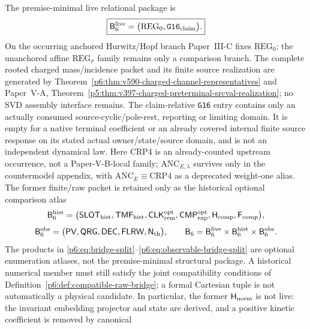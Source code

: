 \documentclass[12pt,a4paper]{article}
\newcommand{\BridgeSix}{\mathsf B_6}
\newcommand{\BridgeLive}{\mathsf B_6^{\rm live}}
\newcommand{\BridgeRaw}{\mathsf B_6^{\rm hist}}
\newcommand{\BridgeObs}{\mathsf B_6^{\rm obs}}
\newcommand{\CLKrem}{\mathsf{CLK}_{\rm rem}}
\newcommand{\CMPexp}{\mathsf{CMP}_{\rm exp}}
\begin{document}
\begin{definition}
\label{p6:def:bridge-split}
The premise-minimal live relational package is
\begin{equation}
\label{p6:eq:live-bridge-split}
\boxed{
\BridgeLive
=
\bigl(
\mathrm{REG}_{0},
\texttt{G16}_{\rm claim}
\bigr).
}
\end{equation}
On the occurring anchored Hurwitz/Hopf branch Paper~III-C fixes
$\mathrm{REG}_0$; the unanchored affine $\mathrm{REG}_\sigma$ family remains
only a comparison branch. The complete rooted charged mass/incidence packet
and its finite source realization are generated by
Theorem~\ref{p6:thm:v590-charged-channel-representatives} and Paper~V-A,
Theorem~\ref{p5:thm:v397-charged-preterminal-srcval-realization}; no SVD
assembly interface remains. The claim-relative \texttt{G16} entry contains
only an actually consumed source-cyclic/pole-rest, reporting or limiting
domain. It is empty for a native terminal coefficient or an already covered
internal finite source response on its stated actual owner/state/source domain,
and is not an independent dynamical law.  Here CRP4 is an already-counted upstream occurrence,
not a Paper-V-B-local family; \(\mathrm{ANC}_{E,\lambda}\) survives only in the countermodel
appendix, with \(\mathrm{ANC}_E\equiv\mathrm{CRP4}\) as a deprecated
weight-one alias.  The former finite/raw packet is retained only as the
historical optional comparison atlas
\begin{equation}
\label{p6:eq:bridge-split}
\BridgeRaw
=
\bigl(
\mathsf{SLOT}_{\rm hist},
\mathsf{TMF}_{\rm hist},
\CLKrem^{\rm opt},
\CMPexp^{\rm opt},
\mathsf H_{\rm comp},
\mathsf F_{\rm comp}
\bigr),
\end{equation}
\begin{equation}
\label{p6:eq:observable-bridge-split}
\BridgeObs
=
\bigl(
\mathsf{PV},
\mathsf{QRG},
\mathsf{DEC},
\mathsf{FLRW},
\mathsf N_{\rm th}
\bigr),
\qquad
\BridgeSix=\BridgeLive\times\BridgeRaw\times\BridgeObs .
\end{equation}
The products in \eqref{p6:eq:bridge-split}--\eqref{p6:eq:observable-bridge-split}
are optional enumeration atlases, not the premise-minimal structural package.
A historical numerical member must still satisfy the joint compatibility
conditions of Definition~\ref{p6:def:compatible-raw-bridge}; a formal Cartesian
tuple is not automatically a physical candidate.  In particular, the former
\(\mathsf H_{\rm norm}\) is not live: the invariant embedding projector and
state are derived, and a positive kinetic coefficient is removed by canonical

\end{definition}
\end{document}
